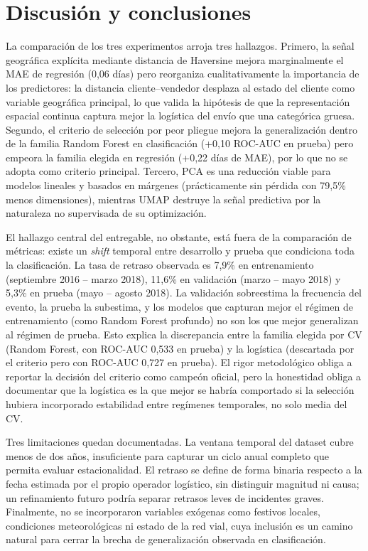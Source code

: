 \documentclass[journal]{IEEEtran}
\begin{document}
\section{Discusión y conclusiones}
\label{sec:discusion}

La comparación de los tres experimentos arroja tres hallazgos. Primero, la señal geográfica explícita mediante distancia de Haversine mejora marginalmente el MAE de regresión (0,06 días) pero reorganiza cualitativamente la importancia de los predictores: la distancia cliente--vendedor desplaza al estado del cliente como variable geográfica principal, lo que valida la hipótesis de que la representación espacial continua captura mejor la logística del envío que una categórica gruesa. Segundo, el criterio de selección por peor pliegue mejora la generalización dentro de la familia Random Forest en clasificación (+0,10 ROC-AUC en prueba) pero empeora la familia elegida en regresión (+0,22 días de MAE), por lo que no se adopta como criterio principal. Tercero, PCA es una reducción viable para modelos lineales y basados en márgenes (prácticamente sin pérdida con 79,5\% menos dimensiones), mientras UMAP destruye la señal predictiva por la naturaleza no supervisada de su optimización.

El hallazgo central del entregable, no obstante, está fuera de la comparación de métricas: existe un \textit{shift} temporal entre desarrollo y prueba que condiciona toda la clasificación. La tasa de retraso observada es 7,9\% en entrenamiento (septiembre 2016 -- marzo 2018), 11,6\% en validación (marzo -- mayo 2018) y 5,3\% en prueba (mayo -- agosto 2018). La validación sobreestima la frecuencia del evento, la prueba la subestima, y los modelos que capturan mejor el régimen de entrenamiento (como Random Forest profundo) no son los que mejor generalizan al régimen de prueba. Esto explica la discrepancia entre la familia elegida por CV (Random Forest, con ROC-AUC 0,533 en prueba) y la logística (descartada por el criterio pero con ROC-AUC 0,727 en prueba). El rigor metodológico obliga a reportar la decisión del criterio como campeón oficial, pero la honestidad obliga a documentar que la logística es la que mejor se habría comportado si la selección hubiera incorporado estabilidad entre regímenes temporales, no solo media del CV.

Tres limitaciones quedan documentadas. La ventana temporal del dataset cubre menos de dos años, insuficiente para capturar un ciclo anual completo que permita evaluar estacionalidad. El retraso se define de forma binaria respecto a la fecha estimada por el propio operador logístico, sin distinguir magnitud ni causa; un refinamiento futuro podría separar retrasos leves de incidentes graves. Finalmente, no se incorporaron variables exógenas como festivos locales, condiciones meteorológicas ni estado de la red vial, cuya inclusión es un camino natural para cerrar la brecha de generalización observada en clasificación.
\end{document}
